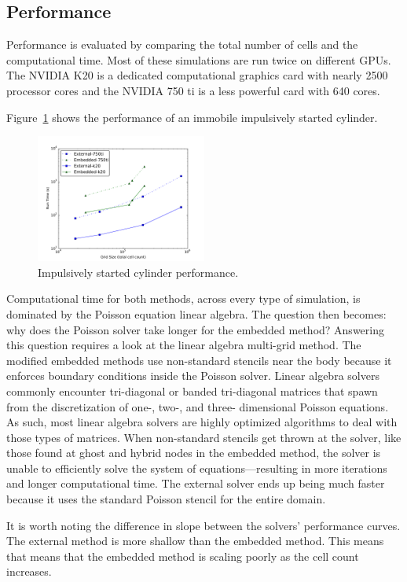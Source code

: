 \documentclass[preprint,12pt]{elsarticle}
\begin{document}
\subsection{Performance}
Performance is evaluated by comparing the total number of cells and the computational time.
Most of these simulations are run twice on different GPUs.
The NVIDIA K20 is a dedicated computational graphics card with nearly 2500 processor cores and the NVIDIA 750 ti is a less powerful card with 640 cores.

Figure~\ref{fig:cyperf} shows the performance of an immobile impulsively started cylinder.
\begin{figure}[!htb]
	\centering
	\includegraphics[width=0.5\textwidth]{cylinder_performance}
	\caption{Impulsively started cylinder performance.}
	\label{fig:cyperf}
\end{figure}
Computational time for both methods, across every type of simulation, is dominated by the Poisson equation linear algebra.
The question then becomes: why does the Poisson solver take longer for the embedded method?
Answering this question requires a look at the linear algebra multi-grid method.
The modified embedded methods use non-standard stencils near the body because it enforces boundary conditions inside the Poisson solver.
Linear algebra solvers commonly encounter tri-diagonal or banded tri-diagonal
matrices that spawn from the discretization of one-, two-, and three- dimensional Poisson equations.
As such, most linear algebra solvers are highly optimized algorithms to deal with those types of matrices.
When non-standard stencils get thrown at the solver, like those found at ghost and hybrid nodes in the embedded method, the solver is unable to efficiently solve the system of equations---resulting in more iterations and longer computational time.
The external solver ends up being much faster because it uses the standard Poisson stencil for the entire domain.

It is worth noting the difference in slope between the solvers' performance curves.
The external method is more shallow than the embedded method.
This means that means that the embedded method is scaling poorly as the cell count increases.
\end{document}
